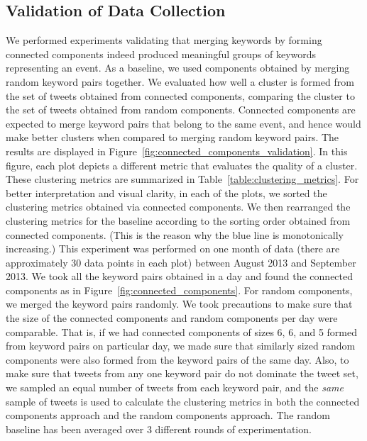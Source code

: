 \subsection{Validation of Data Collection}
We performed experiments validating that merging keywords by forming
connected components indeed produced meaningful groups of keywords
representing an event. As a baseline, we used components obtained by
merging random keyword pairs together. We evaluated how well a cluster
is formed from the set of tweets obtained from connected components,
comparing the cluster to the set of tweets obtained from random
components. Connected components are expected to merge
keyword pairs that belong to the same event, and hence would make
better clusters when compared to merging random keyword pairs. The
results are displayed in
Figure~\ref{fig:connected_components_validation}. In this figure, each
plot depicts a different metric that evaluates the quality of a
cluster. These clustering metrics are summarized in
Table~\ref{table:clustering_metrics}. For better interpretation and
visual clarity, in each of the plots, we sorted the clustering metrics
obtained via connected components. We then rearranged the clustering
metrics for the baseline according to the sorting order obtained from
connected components. (This is the reason why the blue line is
monotonically increasing.) This experiment was performed on one month
of data (there are approximately 30 data points in each plot) between
August 2013 and September 2013. We took all the keyword pairs obtained
in a day and found the connected components as in
Figure~\ref{fig:connected_components}. For random components, we
merged the keyword pairs randomly. We took precautions to make sure
that the size of the connected components and random components per
day were comparable. That is, if we had connected components of sizes
6, 6, and 5 formed from keyword pairs on particular day, we made sure
that similarly sized random components were also formed from the
keyword pairs of the same day. Also, to make sure that tweets from any
one keyword pair do not dominate the tweet set, we sampled an equal
number of tweets from each keyword pair, and the \emph{same} sample of
tweets is used to calculate the clustering metrics in both the connected
components approach and the random components approach. The random
baseline has been averaged over 3 different rounds of experimentation.

